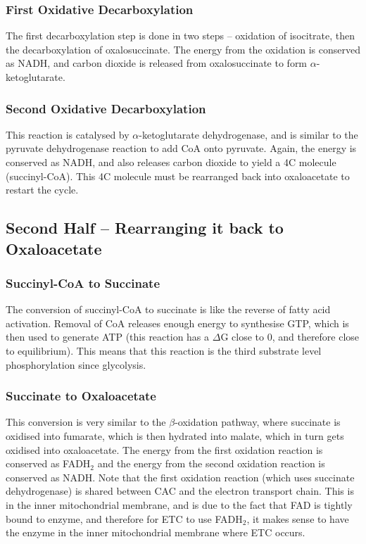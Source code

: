 \subsubsection{First Oxidative Decarboxylation}

The first decarboxylation step is done in two steps -- oxidation of isocitrate, then the decarboxylation of oxalosuccinate.
The energy from the oxidation is conserved as NADH, and carbon dioxide is released from oxalosuccinate to form $\alpha$-ketoglutarate.

\subsubsection{Second Oxidative Decarboxylation}

This reaction is catalysed by $\alpha$-ketoglutarate dehydrogenase, and is similar to the pyruvate dehydrogenase reaction to add CoA onto pyruvate.
Again, the energy is conserved as NADH, and also releases carbon dioxide to yield a 4C molecule (succinyl-CoA).
This 4C molecule must be rearranged back into oxaloacetate to restart the cycle.

\subsection{Second Half -- Rearranging it back to Oxaloacetate}

\subsubsection{Succinyl-CoA to Succinate}

The conversion of succinyl-CoA to succinate is like the reverse of fatty acid activation.
Removal of CoA releases enough energy to synthesise GTP, which is then used to generate ATP (this reaction has a $\Delta$G close to 0, and therefore close to equilibrium).
This means that this reaction is the third substrate level phosphorylation since glycolysis.

\subsubsection{Succinate to Oxaloacetate}

This conversion is very similar to the $\beta$-oxidation pathway, where succinate is oxidised into fumarate, which is then hydrated into malate, which in turn gets oxidised into oxaloacetate.
The energy from the first oxidation reaction is conserved as FADH$_2$ and the energy from the second oxidation reaction is conserved as NADH.
Note that the first oxidation reaction (which uses succinate dehydrogenase) is shared between CAC and the electron transport chain.
This is in the inner mitochondrial membrane, and is due to the fact that FAD is tightly bound to enzyme, and therefore for ETC to use FADH$_2$, it makes sense to have the enzyme in the inner mitochondrial membrane where ETC occurs.

\begin{center}
\end{center}

